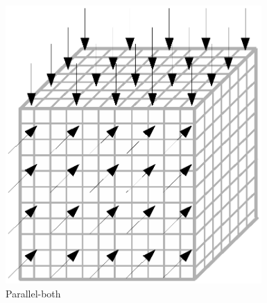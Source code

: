 \documentclass{article}
\begin{document}
\begin{figure}[h]
\begin{center}
\includegraphics[trim={{100pt} {150pt} {100pt} {150pt}}, clip, height=300pt]{img/parallel-both.eps}
\end{center}
\caption{Parallel-both}
\label{fig:parallel-both}
\end{figure}
\end{document}
